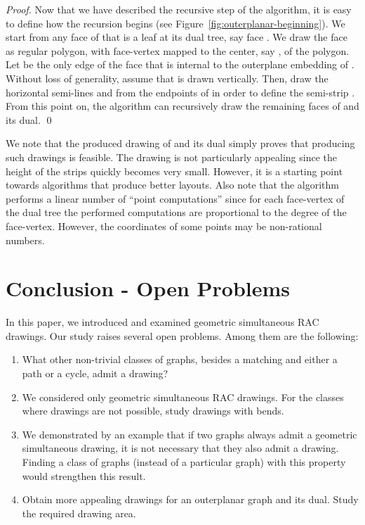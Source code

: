 \documentclass{llncs}
\begin{document}
\begin{proof}
Now that we have described the recursive step of the algorithm, it
is easy to define how the recursion begins (see
Figure~\ref{fig:outerplanar-beginning}). We  start from any face of
 that is a leaf at its dual tree, say face . We draw the face
as regular polygon, with face-vertex  mapped to the center, say
, of the polygon. Let  be the only edge of the face
that is internal to the outerplane embedding of . Without loss of
generality, assume that  is drawn vertically. Then, draw the
horizontal semi-lines  and  from the endpoints of
 in order to define the semi-strip . From this point on,
the algorithm can recursively draw the remaining faces of  and
its dual. \qed
\end{proof}


We note that the produced  drawing of  and its dual 
simply proves that producing such drawings is feasible. The drawing
is not particularly appealing since the height of the strips quickly
becomes very small. However, it is a starting point towards
algorithms that produce better layouts. Also note that the algorithm
performs a linear number of ``point computations'' since for each
face-vertex of the dual tree the performed computations are
proportional to the degree of the face-vertex. However, the
coordinates of some points may be non-rational numbers.


\section{Conclusion - Open Problems}
\label{sec:conclusion}


In this paper, we introduced and examined geometric simultaneous RAC
drawings. Our study raises several open problems. Among them are the
following:
\begin{enumerate}
  \item What other non-trivial classes of graphs, besides a matching and
  either a path or a cycle, admit a  drawing?
  \item We considered only geometric simultaneous RAC drawings. For
  the classes where  drawings are not possible, study
  drawings with bends.
  \item We demonstrated by an example that if two graphs always admit a geometric
  simultaneous drawing, it is not necessary that they also admit a
   drawing. Finding a class of graphs (instead of a particular
  graph) with this property would strengthen this result.
\item Obtain more appealing  drawings for an outerplanar
  graph and its dual. Study the required drawing area.
\end{enumerate}
\end{document}
